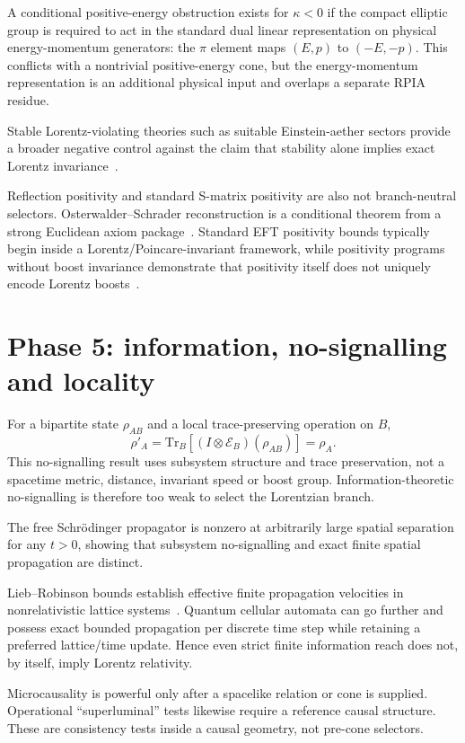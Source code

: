 \documentclass[11pt,a4paper]{article}
\newcommand{\kap}{\kappa}
\begin{document}
A conditional positive-energy obstruction exists for $\kap<0$ if the compact elliptic group is required to act in the standard dual linear representation on physical energy-momentum generators: the $\pi$ element maps $(E,p)$ to $(-E,-p)$.  This conflicts with a nontrivial positive-energy cone, but the energy-momentum representation is an additional physical input and overlaps a separate RPIA residue.

Stable Lorentz-violating theories such as suitable Einstein-aether sectors provide a broader negative control against the claim that stability alone implies exact Lorentz invariance~\cite{donnelly2010}.

Reflection positivity and standard S-matrix positivity are also not branch-neutral selectors.  Osterwalder--Schrader reconstruction is a conditional theorem from a strong Euclidean axiom package~\cite{osterwalder1973,osterwalder1975}.  Standard EFT positivity bounds typically begin inside a Lorentz/Poincare-invariant framework, while positivity programs without boost invariance demonstrate that positivity itself does not uniquely encode Lorentz boosts~\cite{grall2022}.

\section{Phase 5: information, no-signalling and locality}
For a bipartite state $\rho_{AB}$ and a local trace-preserving operation on $B$,
\[
\rho'_A=\mathrm{Tr}_B[(I\otimes\mathcal E_B)(\rho_{AB})]=\rho_A.
\]
This no-signalling result uses subsystem structure and trace preservation, not a spacetime metric, distance, invariant speed or boost group.  Information-theoretic no-signalling is therefore too weak to select the Lorentzian branch.

The free Schr\"odinger propagator is nonzero at arbitrarily large spatial separation for any $t>0$, showing that subsystem no-signalling and exact finite spatial propagation are distinct.

Lieb--Robinson bounds establish effective finite propagation velocities in nonrelativistic lattice systems~\cite{bravyi2006}.  Quantum cellular automata can go further and possess exact bounded propagation per discrete time step while retaining a preferred lattice/time update.  Hence even strict finite information reach does not, by itself, imply Lorentz relativity.

Microcausality is powerful only after a spacelike relation or cone is supplied.  Operational ``superluminal'' tests likewise require a reference causal structure.  These are consistency tests inside a causal geometry, not pre-cone selectors.
\end{document}
